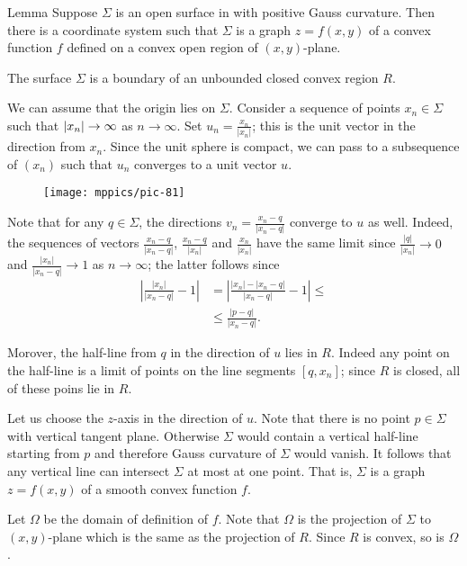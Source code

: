 \begin{thm}{Lemma}\label{lem:graph}
Suppose $\Sigma$ is an open surface in with positive Gauss curvature.
Then there is a coordinate system such that 
$\Sigma$ is a graph $z=f(x,y)$ of a convex function $f$ defined on a convex open region of $(x,y)$-plane.
\end{thm}

The surface $\Sigma$ is a boundary of an unbounded closed convex region $R$.

We can assume that the origin lies on $\Sigma$.
Consider a sequence of points $x_n\in \Sigma$ such that $|x_n|\z\to \infty$ as $n\to \infty$.
Set $u_n=\tfrac{x_n}{|x_n|}$; this is the unit vector in the direction from $x_n$.
Since the unit sphere is compact, we can pass to a subsequence of $(x_n)$ such that $u_n$ converges to a unit vector $u$.

\begin{wrapfigure}[15]{o}{28 mm}
\vskip-0mm
\centering
\texttt{[image: mppics/pic-81]}
\vskip-0mm
\end{wrapfigure}

Note that for any $q\in \Sigma$, the directions $v_n=\tfrac{x_n-q}{|x_n-q|}$ converge to $u$ as well.
Indeed, the sequences of vectors $\tfrac{x_n-q}{|x_n-q|}$, $\tfrac{x_n-q}{|x_n|}$ and 
$\tfrac{x_n}{|x_n|}$ have the same limit since $\tfrac{|q|}{|x_n|}\to 0$
and $\tfrac{|x_n|}{|x_n-q|}\to 1$ as $n\to \infty$;
the latter follows since
\begin{align*}
|\tfrac{|x_n|}{|x_n-q|}-1|&=|\tfrac{|x_n|-|x_n-q|}{|x_n-q|}-1|\le
\\
&\le\tfrac{|p-q|}{|x_n-q|}.
\end{align*}

Morover, the half-line from $q$ in the direction of $u$ lies in $R$.
Indeed any point on the half-line is a limit of points on the line segments $[q,x_n]$;
since $R$ is closed, all of these poins lie in $R$.


Let us choose the $z$-axis in the direction of $u$.
Note that there is no point $p\in\Sigma$ with vertical tangent plane.
Otherwise $\Sigma$ would contain a vertical half-line starting from $p$ and therefore Gauss curvature of $\Sigma$ would vanish.
It follows that any vertical line can intersect $\Sigma$ at most at one point.
That is, $\Sigma$ is a graph $z=f(x,y)$ of a smooth convex function $f$.

Let $\Omega$ be the domain of definition of $f$.
Note that $\Omega$ is the projection of $\Sigma$ to $(x,y)$-plane 
which is the same as the projection of $R$.
Since $R$ is convex, so is $\Omega$.

